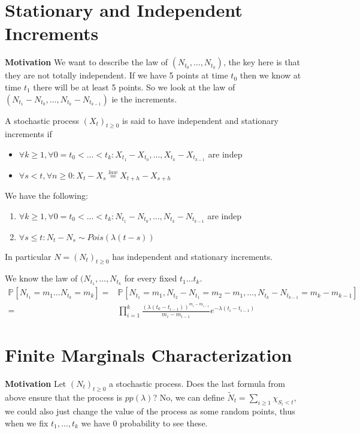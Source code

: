\section{Stationary and Independent Increments}
\textbf{Motivation} We want to describe the law of $(N_{t_0}, \ldots ,N_{t_k})$, the key here is that they are not totally independent. If we have 5 points at time $t_0$ then we know at time $t_1$ there will be at least 5 points. So we look at the law of $(N_{t_1}-N_{t_0}, \ldots ,N_{t_k}-N_{t_{k-1}})$ ie the increments.

\begin{defn}
	A stochastic process $(X_t)_{t\geq 0}$ is said to have independent and stationary increments if 
\begin{itemize}
	\item $\forall k \geq 1, \forall 0=t_0 <  \ldots  < t_k: X_{t_1}-X_{t_0},  \ldots , X_{t_k}- X _{t_{k-1}}$ are indep
	\item $\forall  s<t, \forall  n \geq 0: X_t - X_s \stackrel{law}{=} X _{t+h}-X_{s+h}$
\end{itemize}

\end{defn}

\begin{theorem}
We have the following:
\begin{enumerate}
	\item $\forall k \geq 1, \forall 0=t_0< \ldots <t_k: N_{t_1}-N_{t_0}, \ldots ,N_{t_k}- N_{t_{k-1}}$ are indep
	\item $\forall s \leq t: N_t - N_s \sim Pois(\lambda (t-s))$
\end{enumerate}
In particular $N=(N_t)_{t\geq 0}$ has independent and stationary increments.
	
\end{theorem}

We know the law of $(N_{t_1}, \ldots ,N_{t_k}$ for every fixed $t_1 \ldots t_k$. 
\begin{align}
	\mathbb{P}_{} \left[ N_{t_1}=m_1 \ldots N_{t_k}=m_k \right] =& \mathbb{P}_{} \left[ N_{t_1}=m_1, N_{t_2}-N_{t_1}=m_2 - m_1, \ldots , N_{t_k}-N_{t_{k-1}}=m_k - m_{k-1} \right] \nonumber \\ 
	=& \prod_{i=1}^{k}\frac{(\lambda (t_0 - t_{i-1}))^{m_i-m_{i-1}}}{m_i - m_{i-1}} e^{- \lambda (t_i - t_{i-1})}
\end{align}

\section{Finite Marginals Characterization}
\textbf{Motivation}  Let $(N_t)_{t\geq 0}$ a stochastic process. Does the last formula from above ensure that the process is $pp(\lambda)$? No, we can define $\tilde{N}_t =  \sum_{i \geq 1}^{} \chi_{S_i<t} $, we could also just change the value of the process as some random points, thus when we fix $t_1, \ldots ,t_k$ we have 0 probability to see these.

